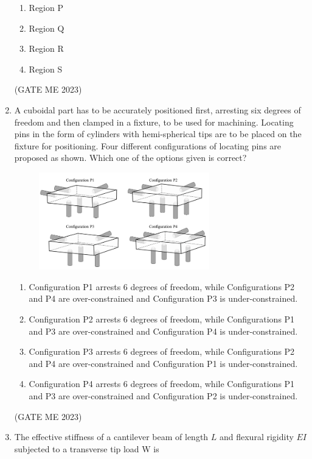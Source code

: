 \documentclass[journal]{IEEEtran}
\begin{document}
\begin{enumerate}
\begin{enumerate}
    \item Region P
    \item Region Q
    \item Region R
    \item Region S
\end{enumerate}
\hfill (GATE ME 2023)

\item A cuboidal part has to be accurately positioned first, arresting six degrees of freedom and then clamped in a fixture, to be used for machining. Locating pins in the form of cylinders with hemi-spherical tips are to be placed on the fixture for positioning. Four different configurations of locating pins are proposed as shown. Which one of the options given is correct?

\begin{figure}[H]
\centering
\includegraphics[width=0.7\textwidth]{Fig 7.png}
\caption{}
\label{fig:question15}
\end{figure}

\begin{enumerate}
    \item Configuration P1 arrests 6 degrees of freedom, while Configurations P2 and P4 are over-constrained and Configuration P3 is under-constrained.
    \item Configuration P2 arrests 6 degrees of freedom, while Configurations P1 and P3 are over-constrained and Configuration P4 is under-constrained.
    \item Configuration P3 arrests 6 degrees of freedom, while Configurations P2 and P4 are over-constrained and Configuration P1 is under-constrained.
    \item Configuration P4 arrests 6 degrees of freedom, while Configurations P1 and P3 are over-constrained and Configuration P2 is under-constrained.
\end{enumerate}
\hfill (GATE ME 2023)

\item The effective stiffness of a cantilever beam of length $ L $ and flexural rigidity $ EI $ subjected to a transverse tip load W is


\end{enumerate}
\end{document}
